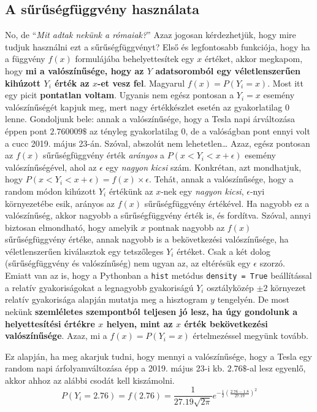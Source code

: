 \documentclass[
]{book}
\begin{document}
\subsection{A sűrűségfüggvény használata}\label{a-sux171rux171suxe9gfuxfcggvuxe9ny-hasznuxe1lata}

No, de ``\emph{Mit adtak nekünk a rómaiak?}'' Azaz jogosan kérdezhetjük, hogy mire tudjuk használni ezt a sűrűségfüggvényt? Első és legfontosabb funkciója, hogy ha a függvény \(f(x)\) formulájába behelyettesítek egy \(x\) értéket, akkor megkapom, hogy \textbf{mi a valószínűsége, hogy az \(Y\) adatsoromból egy véletlenszerűen kihúzott \(Y_i\) érték az \(x\)-et vesz fel}. Magyarul \(f(x)=P(Y_i=x)\).
Most itt egy picit \textbf{pontatlan voltam}. Ugyanis nem egész pontosan a \(Y_i=x\) esemény valószínűségét kapjuk meg, mert nagy értékkészlet esetén az gyakorlatilag \(0\) lenne. Gondoljunk bele: annak a valószínűsége, hogy a Tesla napi árváltozása éppen pont \(2.760009\$\) az tényleg gyakorlatilag \(0\), de a valóságban pont ennyi volt a cucc 2019. május 23-án. Szóval, abszolút nem lehetetlen\ldots{} Azaz, egész pontosan az \(f(x)\) sűrűségfüggvény érték \emph{arányos} a \(P(x<Y_i<x+ \epsilon)\) esemény valószínűségével, ahol az \(\epsilon\) egy \emph{nagyon kicsi} szám. Konkrétan, azt mondhatjuk, hogy \(P(x<Y_i<x+ \epsilon)=f(x) \times \epsilon\). Tehát, annak a valószínűsége, hogy a random módon kihúzott \(Y_i\) értékünk az \(x\)-nek egy \emph{nagyon kicsi}, \(\epsilon\)-nyi környezetébe esik, arányos az \(f(x)\) sűrűségfüggvény értékével. Ha nagyobb ez a valószínűség, akkor nagyobb a sűrűségfüggvény érték is, és fordítva. Szóval, annyi biztosan elmondható, hogy amelyik \(x\) pontnak nagyobb az \(f(x)\) sűrűségfüggvény értéke, annak nagyobb is a bekövetkezési valószínűsége, ha véletlenszerűen kiválasztok egy tetszőleges \(Y_i\) értéket. Csak a két dolog (sűrűségfüggvény és valószínűség) nem ugyan az, az eltérésük egy \(\epsilon\) szorzó.
Emiatt van az is, hogy a Pythonban a \texttt{hist} metódus \texttt{density\ =\ True} beállítással a relatív gyakoriságokat a legnagyobb gyakoriságú \(Y_i\) osztályközép \(\pm 2\) környezet relatív gyakorisága alapján mutatja meg a hisztogram \(y\) tengelyén.
De most nekünk \textbf{szemléletes szempontból teljesen jó lesz, ha úgy gondolunk a helyettesítési értékre \(x\) helyen, mint az \(x\) érték bekövetkezési valószínűsége}. Azaz, mi a \(f(x)=P(Y_i=x)\) értelmezéssel megyünk tovább.

Ez alapján, ha meg akarjuk tudni, hogy mennyi a valószínűsége, hogy a Tesla egy random napi árfolyamváltozása épp a 2019. május 23-i kb. \(2.76\$\)-al lesz egyenlő, akkor ahhoz az alábbi csodát kell kiszámolni.\[P(Y_i=2.76)=f(2.76)=\frac{1}{27.19\sqrt{2\pi}}e^{-\frac{1}{2}\left(\frac{2.76-1.8}{27.19}\right)^2}\]
\end{document}
